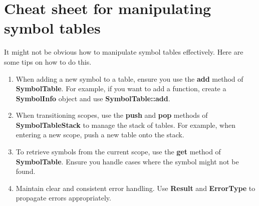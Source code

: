 \documentclass[
	12pt, %
]{fphw}
\begin{document}
\section*{Cheat sheet for manipulating symbol tables}

\begin{problem}
    It might not be obvious how to manipulate symbol tables effectively. Here are some tips on how to do this.
    \\
    \begin{enumerate}
        \item When adding a new symbol to a table, ensure you use the \textbf{add} method of \textbf{SymbolTable}. For example, if you want to add a function, create a \textbf{SymbolInfo} object and use \textbf{SymbolTable::add}.
        \item When transitioning scopes, use the \textbf{push} and \textbf{pop} methods of \textbf{SymbolTableStack} to manage the stack of tables. For example, when entering a new scope, push a new table onto the stack.
        \item To retrieve symbols from the current scope, use the \textbf{get} method of \textbf{SymbolTable}. Ensure you handle cases where the symbol might not be found.
        \item Maintain clear and consistent error handling. Use \textbf{Result} and \textbf{ErrorType} to propagate errors appropriately.
    \end{enumerate}
\end{problem}

\pagebreak
\end{document}

